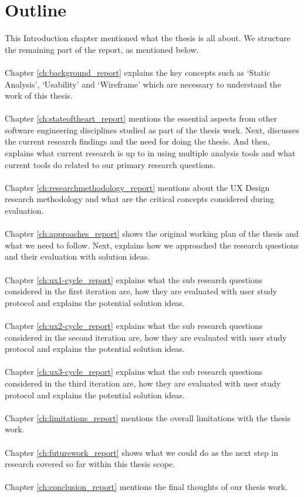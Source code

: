 \section{Outline}

This Introduction chapter mentioned what the thesis is all about. We structure the remaining part of the report, as mentioned below. \\ \\

\noindent Chapter \ref{ch:background_report} explains the key concepts such as ‘Static Analysis’, ‘Usability’ and ‘Wireframe’ which are necessary to understand the work of this thesis. \\ \\
Chapter \ref{ch:stateoftheart_report} mentions the essential aspects from other software engineering disciplines studied as part of the thesis work. Next, discusses the current research findings and the need for doing the thesis. And then, explains what current research is up to in using multiple analysis tools and what current tools do related to our primary research questions. \\ \\
Chapter \ref{ch:researchmethodology_report} mentions about the UX Design research methodology and what are the critical concepts considered during evaluation. \\ \\
Chapter \ref{ch:approaches_report} shows the original working plan of the thesis and what we need to follow. Next, explains how we approached the research questions and their evaluation with solution ideas. \\ \\
Chapter \ref{ch:ux1-cycle_report} explains what the sub research questions considered in the first iteration are, how they are evaluated with user study protocol and explains the potential solution ideas. \\ \\
Chapter \ref{ch:ux2-cycle_report} explains what the sub research questions considered in the second iteration are, how they are evaluated with user study protocol and explains the potential solution ideas. \\ \\
Chapter \ref{ch:ux3-cycle_report} explains what the sub research questions considered in the third iteration are, how they are evaluated with user study protocol and explains the potential solution ideas. \\ \\
Chapter \ref{ch:limitations_report} mentions the overall limitations with the thesis work. \\ \\
Chapter \ref{ch:futurework_report} shows what we could do as the next step in research covered so far within this thesis scope. \\ \\
Chapter \ref{ch:conclusion_report} mentions the final thoughts of our thesis work. \\ \\

\let\cleardoublepage\clearpage
